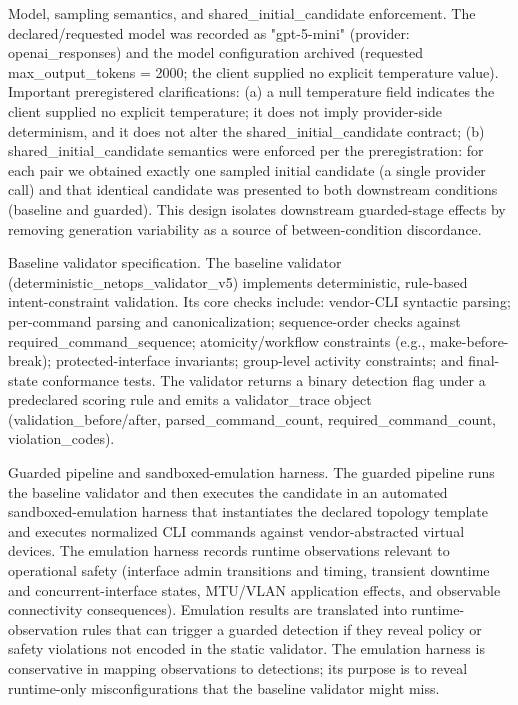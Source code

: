 \documentclass[conference]{IEEEtran}
\begin{document}
Model, sampling semantics, and shared\_initial\_candidate enforcement. The declared/requested model was recorded as "gpt-5-mini" (provider: openai\_responses) and the model configuration archived (requested max\_output\_tokens = 2000; the client supplied no explicit temperature value). Important preregistered clarifications: (a) a null temperature field indicates the client supplied no explicit temperature; it does not imply provider-side determinism, and it does not alter the shared\_initial\_candidate contract; (b) shared\_initial\_candidate semantics were enforced per the preregistration: for each pair we obtained exactly one sampled initial candidate (a single provider call) and that identical candidate was presented to both downstream conditions (baseline and guarded). This design isolates downstream guarded-stage effects by removing generation variability as a source of between-condition discordance.

Baseline validator specification. The baseline validator (deterministic\_netops\_validator\_v5) implements deterministic, rule-based intent-constraint validation. Its core checks include: vendor-CLI syntactic parsing; per-command parsing and canonicalization; sequence-order checks against required\_command\_sequence; atomicity/workflow constraints (e.g., make-before-break); protected-interface invariants; group-level activity constraints; and final-state conformance tests. The validator returns a binary detection flag under a predeclared scoring rule and emits a validator\_trace object (validation\_before/after, parsed\_command\_count, required\_command\_count, violation\_codes).

Guarded pipeline and sandboxed-emulation harness. The guarded pipeline runs the baseline validator and then executes the candidate in an automated sandboxed-emulation harness that instantiates the declared topology template and executes normalized CLI commands against vendor-abstracted virtual devices. The emulation harness records runtime observations relevant to operational safety (interface admin transitions and timing, transient downtime and concurrent-interface states, MTU/VLAN application effects, and observable connectivity consequences). Emulation results are translated into runtime-observation rules that can trigger a guarded detection if they reveal policy or safety violations not encoded in the static validator. The emulation harness is conservative in mapping observations to detections; its purpose is to reveal runtime-only misconfigurations that the baseline validator might miss.
\end{document}
